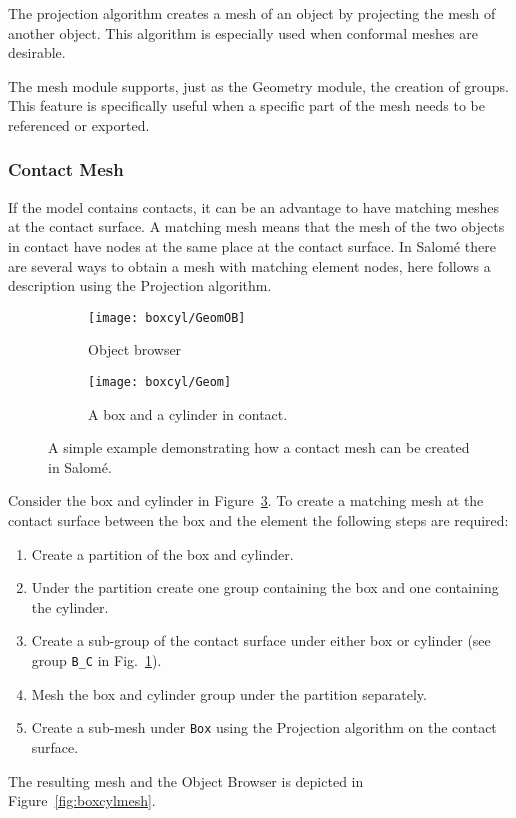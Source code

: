 The projection algorithm creates a mesh of an object by projecting the mesh of another object. This algorithm is especially used when conformal meshes are desirable.

The mesh module supports, just as the Geometry module, the creation of groups. This feature is specifically useful when a specific part of the mesh needs to be referenced or exported.

\subsubsection{Contact Mesh} %
\label{ssub:contact_mesh}
If the model contains contacts, it can be an advantage to have matching meshes at the contact surface. A matching mesh means that the mesh of the two objects in contact have nodes at the same place at the contact surface. In Salomé there are several ways to obtain a mesh with matching element nodes, here follows a description using the Projection algorithm.

\begin{figure}[t]
	\begin{subfigure}{.35\textwidth}
		\begin{center}
			\texttt{[image: boxcyl/GeomOB]}
		\end{center}
		\caption{Object browser}
		\label{subfig:boxcylgeomob}
	\end{subfigure}
	\begin{subfigure}{.7\textwidth}
		\begin{center}
			\texttt{[image: boxcyl/Geom]}
		\end{center}
		\caption{A box and a cylinder in contact.}
		\label{subfig:boxcylgeom}
	\end{subfigure}
	\caption{A simple example demonstrating how a contact mesh can be created in Salomé.}
	\label{fig:boxcylgeom}
\end{figure}

Consider the box and cylinder in Figure~\ref{fig:boxcylgeom}. To create a matching mesh at the contact surface between the box and the element the following steps are required:
\begin{enumerate}
	\item Create a partition of the box and cylinder.
	\item Under the partition create one group containing the box and one containing the cylinder.
	\item Create a sub-group of the contact surface under either box or cylinder (see group \texttt{B\_C} in Fig.~\ref{subfig:boxcylgeomob}).
	\item Mesh the box and cylinder group under the partition separately.
	\item Create a sub-mesh under \texttt{Box} using the Projection algorithm on the contact surface.
\end{enumerate}
The resulting mesh and the Object Browser is depicted in Figure~\ref{fig:boxcylmesh}.

